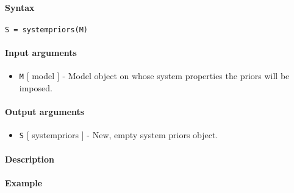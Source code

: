 


	\paragraph{Syntax}\label{syntax}

\begin{verbatim}
S = systempriors(M)
\end{verbatim}

\paragraph{Input arguments}\label{input-arguments}

\begin{itemize}
\itemsep1pt\parskip0pt
\item
  \texttt{M} {[} model {]} - Model object on whose system properties the
  priors will be imposed.
\end{itemize}

\paragraph{Output arguments}\label{output-arguments}

\begin{itemize}
\itemsep1pt\parskip0pt
\item
  \texttt{S} {[} systempriors {]} - New, empty system priors object.
\end{itemize}

\paragraph{Description}\label{description}

\paragraph{Example}\label{example}


